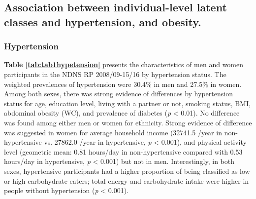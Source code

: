

\subsection{Association between individual-level latent classes and hypertension, and obesity.}\vspace{-0.3cm}

\subsubsection{Hypertension}\vspace{-0.3cm}

\textbf{Table \ref{tab:tab1hypetension}} presents the characteristics of men and women participants in the NDNS RP 2008/09-15/16 by hypertension status. The weighted prevalences of hypertension were 30.4\% in men and 27.5\% in women. Among both sexes, there was strong evidence of differences by hypertension status for age, education level, living with a partner or not, smoking status, BMI, abdominal obesity (WC), and prevalence of diabetes (\textit{p} < 0.01). No difference was found among either men or women for ethnicity. Strong evidence of difference was suggested in women for average household income (32741.5 \textsterling/year in non-hypertensive vs. 27862.0 \textsterling/year in hypertensive, \textit{p} < 0.001), and physical activity level (geometric mean: 0.81 hours/day in non-hypertensive compared with 0.53 hours/day in hypertensive, \textit{p} < 0.001) but not in men. Interestingly, in both sexes, hypertensive participants had a higher proportion of being classified as low or high carbohydrate eaters; total energy and carbohydrate intake were higher in people without hypertension (\textit{p} < 0.001).

